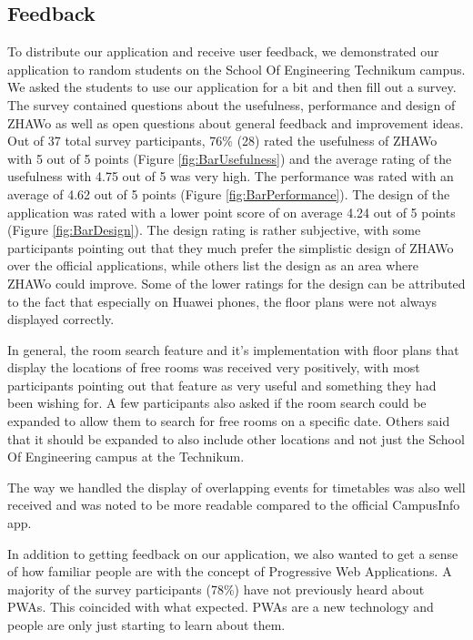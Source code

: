 \begin{markdown}
\section{Feedback} \label{feedback}

To distribute our application and receive user feedback, we demonstrated our application to random students on the School Of Engineering Technikum campus. We asked the students to use our application for a bit and then fill out a survey. The survey contained questions about the usefulness, performance and design of ZHAWo as well as open questions about general feedback and improvement ideas. Out of 37 total survey participants, 76\% (28) rated the usefulness of ZHAWo with 5 out of 5 points (Figure \ref{fig:BarUsefulness}) and the average rating of the usefulness with 4.75 out of 5 was very high. The performance was rated with an average of 4.62 out of 5 points (Figure \ref{fig:BarPerformance}). The design of the application was rated with a lower point score of on average 4.24 out of 5 points (Figure \ref{fig:BarDesign}). The design rating is rather subjective, with some participants pointing out that they much prefer the simplistic design of ZHAWo over the official applications, while others list the design as an area where ZHAWo could improve. Some of the lower ratings for the design can be attributed to the fact that especially on Huawei phones, the floor plans were not always displayed correctly.

In general, the room search feature and it's implementation with floor plans that display the locations of free rooms was received very positively, with most participants pointing out that feature as very useful and something they had been wishing for. A few participants also asked if the room search could be expanded to allow them to search for free rooms on a specific date. Others said that it should be expanded to also include other locations and not just the School Of Engineering campus at the Technikum.

The way we handled the display of overlapping events for timetables was also well received and was noted to be more readable compared to the official CampusInfo app.

In addition to getting feedback on our application, we also wanted to get a sense of how familiar people are with the concept of Progressive Web Applications. A majority of the survey participants (78\%) have not previously heard about PWAs. This coincided with what expected. PWAs are a new technology and people are only just starting to learn about them.


\end{markdown}
